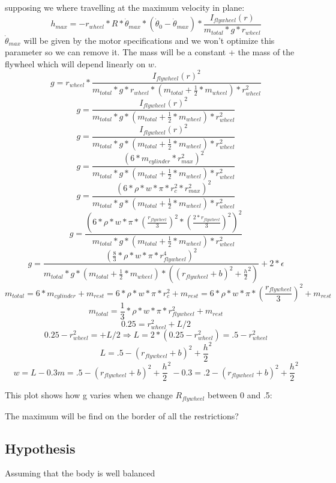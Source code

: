 supposing we where travelling at the maximum velocity in plane:
\[h_{max}= - r_{wheel} * R * \dot{\theta}_{max} * (\dot{\theta}_0-\dot{\theta}_{max}) * \frac{I_{flywheel}(r)}{m_{total} * g * r_{wheel}}\]
$\dot{\theta}_{max}$ will be given by the motor specifications and we won't optimize this parameter so we can remove it.
The mass will be a constant + the mass of the flywheel which will depend linearly on $w$.
\[g= r_{wheel} * \frac{I_{flywheel}(r)^2}{m_{total} * g * r_{wheel}*(m_{total} + \frac{1}{2} *m_{wheel}) * r_{wheel}^2}\]
\[g= \frac{I_{flywheel}(r)^2}{m_{total} * g * (m_{total} + \frac{1}{2} *m_{wheel}) * r_{wheel}^2}\]
\[g= \frac{I_{flywheel}(r)^2}{m_{total} * g * (m_{total} + \frac{1}{2} *m_{wheel}) * r_{wheel}^2}\]
\[g= \frac{(6 * m_{cylinder} * r_{max}^2)^2}{m_{total} * g * (m_{total} + \frac{1}{2} *m_{wheel}) * r_{wheel}^2}\]
\[g= \frac{(6 * \rho * w * \pi * r_c^2* r_{max}^2)^2}{m_{total} * g * (m_{total} + \frac{1}{2} *m_{wheel}) * r_{wheel}^2}\]
\[g= \frac{(6 * \rho * w * \pi * (\frac{r_{flywheel}}{3})^2* (\frac{2*r_{flywheel}}{3})^2)^2}{m_{total} * g * (m_{total} + \frac{1}{2} *m_{wheel}) * r_{wheel}^2}\]
\[g= \frac{(\frac{8}{3} * \rho * w * \pi * r_{flywheel}^4)^2}{m_{total} * g * (m_{total} + \frac{1}{2} *m_{wheel}) * ((r_{flywheel} + b)^2+\frac{h}{2}^2)} + 2*\epsilon\]
\[m_{total} =6* m_{cylinder}+m_{rest} = 6 * \rho * w * \pi * r_c^2 + m_{rest} = 6 * \rho * w * \pi * (\frac{r_{flywheel}}{3})^2 + m_{rest} \]
\[m_{total} =\frac{1}{3} * \rho * w * \pi * r_{flywheel}^2 + m_{rest} \]
\[0.25 = r_{wheel}^2 + L/2\]
\[0.25 - r_{wheel}^2 =  + L/2 \Rightarrow L=2*(0.25-r_{wheel}^2) = .5-r_{wheel}^2\]
\[ L = .5-(r_{flywheel} + b)^2+\frac{h}{2}^2 \]
\[w = L - 0.3m = .5-(r_{flywheel} + b)^2+\frac{h}{2}^2 -0.3 = .2-(r_{flywheel} + b)^2+\frac{h}{2}^2\]

This plot shows how g varies when we change $R_{flywheel}$ between 0 and .5:


The maximum will be find on the border of all the restrictions?





\subsection{Hypothesis}
Assuming that the body is well balanced
